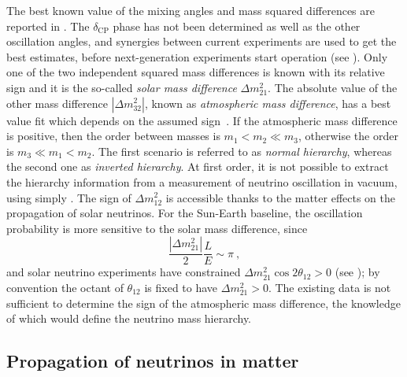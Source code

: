 The best known value of the mixing angles and mass squared differences are reported in .
The $\delta_\text{CP}$ phase has not been determined as well as the other oscillation angles, %
and synergies between current experiments are used to get the best estimates, before %
next-generation experiments start operation (see ).
Only one of the two independent squared mass differences is known with its relative sign and %
it is the so-called \emph{solar mass difference} $\Delta m_{21}^2$.
The absolute value of the other mass difference $|\Delta m_{32}^2|$, %
known as \emph{atmospheric mass difference}, has a best value fit which depends on the assumed sign~\cite{Esteban:2018azc}.
If the atmospheric mass difference is positive, then the order between masses is $m_1 < m_2 \ll m_3$, %
otherwise the order is $m_3 \ll m_1 < m_2$.
The first scenario is referred to as \emph{normal hierarchy}, whereas the second one as \emph{inverted hierarchy}.
At first order, it is not possible to extract the hierarchy information from a measurement of neutrino oscillation in vacuum, %
using simply .
The sign of $\Delta m_{12}^2$ is accessible thanks to the matter effects on the propagation of solar neutrinos.
For the Sun-Earth baseline, the oscillation probability is more sensitive to the solar mass difference, since %
\begin{equation}
	\frac{|\Delta m_{21}^2|}{2} \frac{L}{E} \sim \pi\ ,
\end{equation}
and solar neutrino experiments have constrained $\Delta m_{21}^2 \cos 2\theta_{12} > 0$ (see );
by convention the octant of $\theta_{12}$ is fixed to have $\Delta m_{21}^2 > 0$.
The existing data is not sufficient to determine the sign of the atmospheric mass difference, 
the knowledge of which would define the neutrino mass hierarchy.



\subsection{Propagation of neutrinos in matter}
\label{sec:neutrino_matter}


